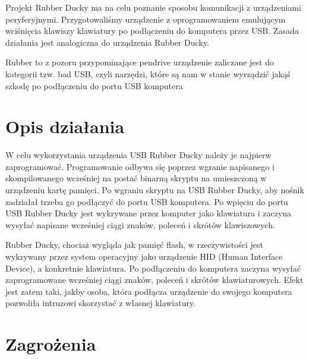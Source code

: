 \documentclass{article}
\begin{document}
Projekt Rubber Ducky ma na celu poznanie sposobu komunikacji z urządzeniami peryferyjnymi. Przygotowaliśmy urządzenie z oprogramowaniem emulującym wciśnięcia klawiszy klawiatury po podłączeniu do komputera przez USB. Zasada działania jest analogiczna do urządzenia Rubber Ducky. 

Rubber to z pozoru przypominające pendrive urządzenie zaliczane jest do kategorii tzw. bad USB, czyli narzędzi, które są nam w stanie wyrządzić jakąś szkodę po podłączeniu do portu USB komputera

\section{Opis działania}

W celu wykorzystania urządzenia USB Rubber Ducky należy je najpierw zaprogramować. Programowanie odbywa się poprzez wgranie napisanego i skompilowanego wcześniej na postać binarną skryptu na umieszczoną w urządzeniu kartę pamięci. Po wgraniu skryptu na USB Rubber Ducky, aby nośnik zadziałał trzeba go podłączyć do portu USB komputera. Po wpięciu do portu USB Rubber Ducky jest wykrywane przez komputer jako klawiatura i zaczyna wysyłać napisane wcześniej ciągi znaków, poleceń i skrótów klawiszowych.

Rubber Ducky, chociaż wygląda jak pamięć flash, w rzeczywistości jest wykrywany przez system operacyjny jako urządzenie HID (Human Interface Device), a konkretnie klawiatura. Po podłączeniu do komputera zaczyna wysyłać zaprogramowane wcześniej ciągi znaków, poleceń i skrótów klawiaturowych. Efekt jest zatem taki, jakby osoba, która podłącza urządzenie do swojego komputera pozwoliła intruzowi skorzystać z własnej klawiatury.

\section{Zagrożenia}
\end{document}
